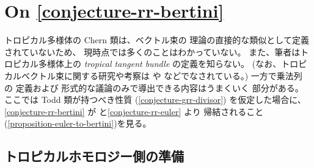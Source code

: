 \documentclass[a4paper,dvipdfmx,reqno,12pt]{amsart}
\theoremstyle{definition}
\numberwithin{equation}{section}
\begin{document}
\section{On \cref{conjecture-rr-bertini}}
\label{section-on-rr-bertini}
\cite{demedrano2023chern}
トロピカル多様体の Chern 類は、ベクトル束の
理論の直接的な類似として定義されていないため、
現時点では多くのことはわかっていない。
また、筆者はトロピカル多様体上の
\emph{tropical tangent bundle} の定義を知らない。
(なお、トロピカルベクトル束に関する研究や考察は
\cite{MR2961320,MR4646329}
や \cite[Theorem 1.8]{amini2020hodge}
などでなされている。)
一方で乗法列 \cite[]{MR1335917} の
定義および
形式的な議論のみで導出できる内容はうまくいく
部分がある。
ここでは Todd 類が持つべき性質
(\cref{conjecture-grr-divisor})
を仮定した場合に、
\cref{conjecture-rr-bertini} 
が\cite[Conjecture 6.13]{demedrano2023chern}
と\cref{conjecture-rr-euler} より
帰結されること
(\cref{proposition-euler-to-bertini})を見る。

\subsection{トロピカルホモロジー側の準備}
\end{document}
